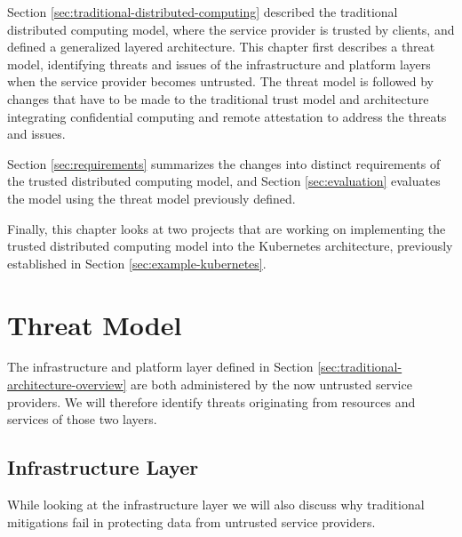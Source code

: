 Section \ref{sec:traditional-distributed-computing} described the traditional
distributed computing model, where the service provider is trusted by clients,
and defined a generalized layered architecture. This chapter first describes a
threat model, identifying threats and issues of the infrastructure and platform
layers when the service provider becomes untrusted. The threat model is followed
by changes that have to be made to the traditional trust model and architecture
integrating confidential computing and remote attestation to address the
threats and issues.

Section \ref{sec:requirements} summarizes the changes into distinct requirements
of the trusted distributed computing model, and Section \ref{sec:evaluation}
evaluates the model using the threat model previously defined.

Finally, this chapter looks at two projects that are working on implementing the
trusted distributed computing model into the Kubernetes architecture, previously
established in Section \ref{sec:example-kubernetes}.

\section{Threat Model}
\label{sec:untrusted-threat-model}

The infrastructure and platform layer defined in Section
\ref{sec:traditional-architecture-overview} are both administered by the now
untrusted service providers. We will therefore identify threats originating from
resources and services of those two layers.

\subsection{Infrastructure Layer}

While looking at the infrastructure layer we will also discuss why traditional
mitigations fail in protecting data from untrusted service providers.

